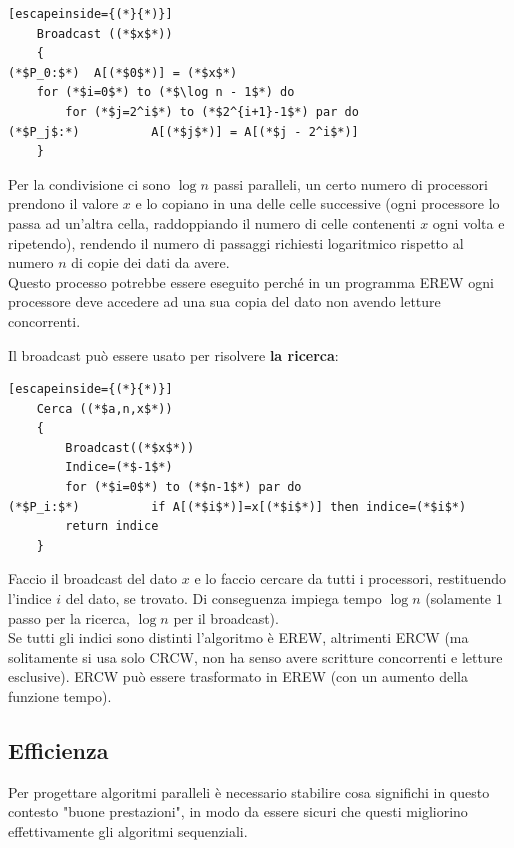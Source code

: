 \documentclass[11pt]{article}
\begin{document}
	\begin{lstlisting}[escapeinside={(*}{*)}]
	Broadcast ((*$x$*))
	{
(*$P_0:$*)	A[(*$0$*)] = (*$x$*)
	for (*$i=0$*) to (*$\log n - 1$*) do
		for (*$j=2^i$*) to (*$2^{i+1}-1$*) par do
(*$P_j$:*)			A[(*$j$*)] = A[(*$j - 2^i$*)]
	}
	\end{lstlisting}
	
	Per la condivisione ci sono $\log n$ passi paralleli, un certo numero di processori prendono il valore $x$ e lo copiano in una delle celle successive (ogni processore lo passa ad un'altra cella, raddoppiando il numero di celle contenenti $x$ ogni volta e ripetendo), rendendo il numero di passaggi richiesti logaritmico rispetto al numero $n$ di copie dei dati da avere.\\
	
	Questo processo potrebbe essere eseguito perché in un programma EREW ogni processore deve accedere ad una sua copia del dato non avendo letture concorrenti. \\
	
	\newpage
	
	Il broadcast può essere usato per risolvere \textbf{la ricerca}:
	\begin{lstlisting}[escapeinside={(*}{*)}]
	Cerca ((*$a,n,x$*))
	{
		Broadcast((*$x$*))
		Indice=(*$-1$*)
		for (*$i=0$*) to (*$n-1$*) par do
(*$P_i:$*)			if A[(*$i$*)]=x[(*$i$*)] then indice=(*$i$*)
		return indice
	}
	\end{lstlisting}
	
	Faccio il broadcast del dato $x$ e lo faccio cercare da tutti i processori, restituendo l'indice $i$ del dato, se trovato. Di conseguenza impiega tempo $\log n$ (solamente $1$ passo per la ricerca, $\log n$ per il broadcast).\\
	
	Se tutti gli indici sono distinti l'algoritmo è EREW, altrimenti ERCW (ma solitamente si usa solo CRCW, non ha senso avere scritture concorrenti e letture esclusive). ERCW può essere trasformato in EREW (con un aumento della funzione tempo).\\
	
	\newpage
	
	\subsection{Efficienza}
	Per progettare algoritmi paralleli è necessario stabilire cosa significhi in questo contesto "buone prestazioni", in modo da essere sicuri che questi migliorino effettivamente gli algoritmi sequenziali. \\
	
\end{document}
